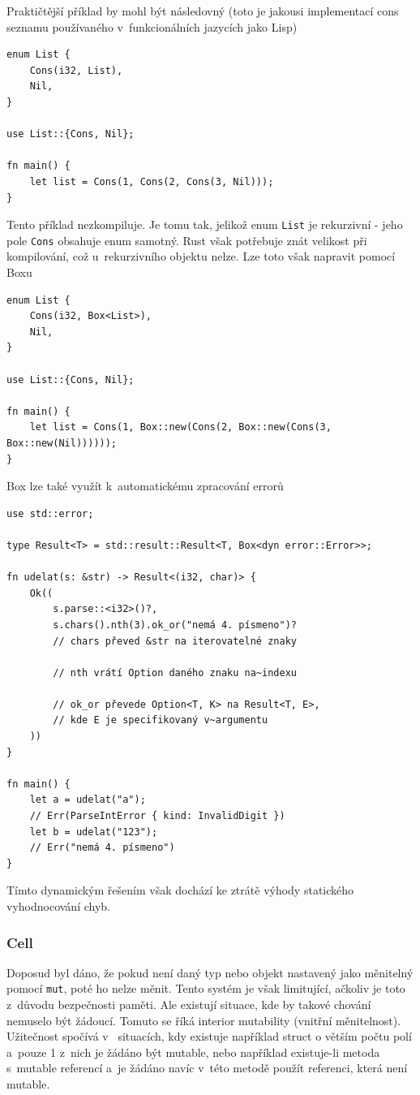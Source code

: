 \documentclass[a4paper, 12pt, twoside]{article} %
\newcommand{\rust}[1]{\texttt{#1}}
\begin{document}
			Praktičtější příklad by mohl být následovný (toto je jakousi implementací cons seznamu používaného v~funkcionálních jazycích jako Lisp)
			\begin{verbatim}
enum List {
	Cons(i32, List),
	Nil,
}

use List::{Cons, Nil};

fn main() {
	let list = Cons(1, Cons(2, Cons(3, Nil)));
}
			\end{verbatim}
			
			Tento příklad nezkompiluje. Je tomu tak, jelikož enum \rust{List} je rekurzivní - jeho pole \rust{Cons} obsahuje enum samotný. Rust však potřebuje znát velikost při kompilování, což u~rekurzivního objektu nelze. Lze toto však napravit pomocí Boxu
			\begin{verbatim}
enum List {
	Cons(i32, Box<List>),
	Nil,
}

use List::{Cons, Nil};

fn main() {
	let list = Cons(1, Box::new(Cons(2, Box::new(Cons(3, Box::new(Nil))))));
}
			\end{verbatim}
			\cite{box}
			
			Box lze také využít k~automatickému zpracování errorů
			\begin{verbatim}
use std::error;

type Result<T> = std::result::Result<T, Box<dyn error::Error>>;

fn udelat(s: &str) -> Result<(i32, char)> {
	Ok((
		s.parse::<i32>()?,
		s.chars().nth(3).ok_or("nemá 4. písmeno")?
		// chars převed &str na iterovatelné znaky

		// nth vrátí Option daného znaku na~indexu
		
		// ok_or převede Option<T, K> na Result<T, E>,
		// kde E je specifikovaný v~argumentu
	))
}

fn main() {
	let a = udelat("a");
	// Err(ParseIntError { kind: InvalidDigit })
	let b = udelat("123");
	// Err("nemá 4. písmeno")
}
			\end{verbatim}
			
			Tímto dynamickým řešením však dochází ke ztrátě výhody statického vyhodnocování chyb.\cite{box_err}
			
		\subsubsection*{Cell}
			Doposud byl dáno, že pokud není daný typ nebo objekt nastavený jako měnitelný pomocí \rust{mut}, poté ho nelze měnit. Tento systém je však limitující, ačkoliv je toto z~důvodu bezpečnosti paměti. Ale existují situace, kde by takové chování nemuselo být žádoucí. Tomuto se říká interior mutability (vnitřní měnitelnost). Užitečnost spočívá v~ situacích, kdy existuje například struct o větším počtu polí a~pouze 1 z~nich je žádáno být mutable, nebo například existuje-li metoda s~mutable referencí a~je žádáno navíc v~této metodě použít referenci, která není mutable.
			
\end{document}
